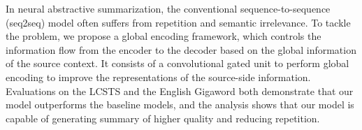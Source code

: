 In neural abstractive summarization, the conventional sequence-to-sequence (seq2seq) model often suffers from repetition and semantic irrelevance. To tackle the problem, we propose a global encoding framework, which controls the information flow from the encoder to the decoder based on the global information of the source context. It consists of a convolutional gated unit to perform global encoding to improve the representations of the source-side information. Evaluations on the LCSTS and the English Gigaword both demonstrate that our model outperforms the baseline models, and the analysis shows that our model is capable of generating summary of higher quality and reducing repetition.
